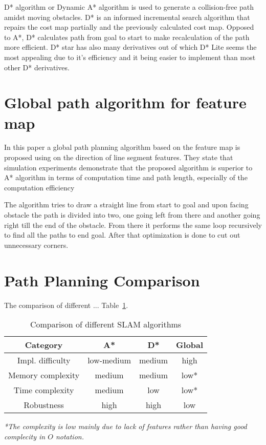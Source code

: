 \documentclass[12pt, a4paper, onecolumn]{article}
\begin{document}
D* algorithm or Dynamic A* algorithm is used to generate a collision-free path amidst moving obstacles.
D* is an informed incremental search algorithm that repairs the cost map partially and the previously calculated cost map. \cite{Karur21}
Opposed to A*, D* calculates path from goal to start to make recalculation of the path more efficient. \cite{DstarWiki}
D* star has also many derivatives out of which D* Lite seems the most appealing due to it's efficiency and it being easier to implement than most other D* derivatives.

\section{Global path algorithm for feature map}

In this \cite{Ren22} paper a global path planning algorithm based on the feature map is proposed using on the direction of line segment features. They state that simulation experiments demonstrate
that the proposed algorithm is superior to A* algorithm in terms of computation time
and path length, especially of the computation efficiency \cite{Ren22}

The algorithm tries to draw a straight line from start to goal and upon facing obstacle the path is divided into two, one going left from there and another going right till the end of the obstacle.
From there it performs the same loop recursively to find all the paths to end goal.
After that optimization is done to cut out unnecessary corners. \cite{Ren22} %

\section{Path Planning Comparison}
The comparison of different ...
Table~\ref{tab:path_algorithms}.
\begin{table}[h!]
  \begin{center}
    \begin{tabular}[c]{|c || c c c |}
      \hline
       Category        &  A*            & D*      & Global     \\
      \hline
      Impl. difficulty & low-medium     & medium  & high \\
      \hline
      Memory complexity & medium        & medium  & low* \\
      \hline
      Time complexity  & medium         & low     & low* \\
      \hline
      Robustness       & high           & high    & low  \\
      \hline
    \end{tabular}
  \end{center}
  \caption{Comparison of different SLAM algorithms}
  \label{tab:path_algorithms}
\end{table}
\textit{*The complexity is low mainly due to lack of features rather than having good complecity in $O$ notation.}
\end{document}
